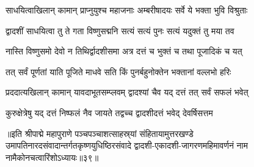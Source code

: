 \twolineshloka
{साधयित्वाखिलान् कामान् प्राप्नुयुश्च महाजनाः}
{अम्बरीषादयः सर्वे ये भक्ता भुवि विश्रुताः}%

\twolineshloka
{द्वादशीं साधयित्वा तु ते गता विष्णुसद्मनि}
{सत्यं सत्यं पुनः सत्यं यदुक्तं तु मया तव}%

\twolineshloka
{नास्ति विष्णुसमो देवो न तिथिर्द्वादशीसमा}
{अत्र दत्तं च भुक्तं च तथा पूजादिकं च यत्}%

\twolineshloka
{तत् सर्वं पूर्णतां याति पूजिते माधवे सति}
{किं पुनर्बहुनोक्तेन भक्तानां वल्लभो हरिः}%

\twolineshloka
{प्रददात्यखिलान् कामान् यावदाभूतसम्प्लवम्}
{द्वादश्यां चैव यद् दत्तं तत् सर्वं सफलं भवेत्}%

\twolineshloka
{कुरुक्षेत्रेषु यद् दत्तं निष्फलं नैव जायते}
{तद्वच्च द्वादशीदत्तं भवेद् देवर्षिसत्तम}%

॥इति श्रीपाद्मे महापुराणे पञ्चपञ्चाशत्साहस्र्यां संहितायामुत्तरखण्डे उमापतिनारदसंवादान्तर्गतकृष्णयुधिष्ठिरसंवादे द्वादशी-एकादशी-जागरणमहिमावर्णनं नाम नामैकोनचत्वारिंशोऽध्यायः॥३९॥

\genMangalaShloka

\hyperref[sec:ekadashi_mahatmyam_padma_puranam]{\closesub}
\clearpage

